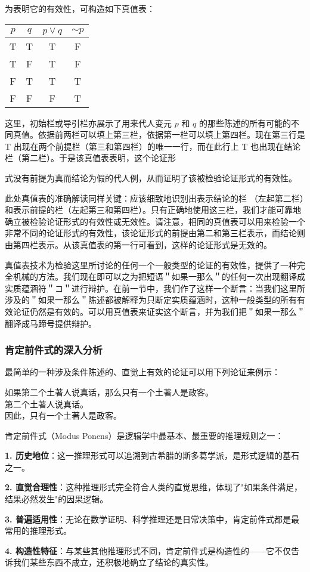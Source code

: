 为表明它的有效性，可构造如下真值表：

\begin{center}
\begin{tabular}{|cccc|}
\hline
$p$ & $q$ & $p \vee q$ & $\sim p$ \\
\hline
T & T & T & F \\
T & F & T & F \\
F & T & T & T \\
F & F & F & T \\
\hline
\end{tabular}
\end{center}

这里，初始栏或导引栏亦展示了用来代人变元 $p$ 和 $q$ 的那些陈述的所有可能的不同真值。依据前两栏可以填上第三栏，依据第一栏可以填上第四栏。现在第三行是 T 出现在两个前提栏（第三和第四栏）的唯一一行，而在此行上 T 也出现在结论栏（第二栏）。于是该真值表表明，这个论证形

式没有前提为真而结论为假的代人例，从而证明了该被检验论证形式的有效性。\cite{jevons1879}

此处真值表的准确解读同样关键：应该细致地识别出表示结论的栏 （左起第二栏）和表示前提的栏（左起第三和第四栏）。只有正确地使用这三栏，我们才能可靠地确立被检验论证形式的有效性或无效性。请注意，相同的真值表可以用来检验一个非常不同的论证形式的有效性，该论证形式的前提由第二和第三栏表示，而结论则由第四栏表示。从该真值表的第一行可看到，这样的论证形式是无效的。

真值表技术为检验这里所讨论的任何一个一般类型的论证的有效性，提供了一种完全机械的方法。我们现在即可以之为把短语＂如果一那么＂的任何一次出现翻译成实质蕴涵符＂コ＂进行辩护。在前一节中，我们作了这样一个断言：当我们这里所涉及的＂如果一那么＂陈述都被解释为只断定实质蕴涵时，这种一般类型的所有有效论证仍然是有效的。可以用真值表来证实这个断言，并为我们把＂如果一那么＂翻译成马蹄号提供辩护。

\subsubsection{肯定前件式的深入分析}

最简单的一种涉及条件陈述的、直觉上有效的论证可以用下列论证来例示：

如果第二个土著人说真话，那么只有一个土著人是政客。\\
第二个土著人说真话。\\
因此，只有一个土著人是政客。

\begin{theorembox}[title=肯定前件式的逻辑基础]
肯定前件式（Modus Ponens）是逻辑学中最基本、最重要的推理规则之一：

\textbf{1. 历史地位}：这一推理形式可以追溯到古希腊的斯多葛学派，是形式逻辑的基石之一。

\textbf{2. 直觉合理性}：这种推理形式完全符合人类的直觉思维，体现了"如果条件满足，结果必然发生"的因果逻辑。

\textbf{3. 普遍适用性}：无论在数学证明、科学推理还是日常决策中，肯定前件式都是最常用的推理形式。

\textbf{4. 构造性特征}：与某些其他推理形式不同，肯定前件式是构造性的——它不仅告诉我们某些东西不成立，还积极地确立了结论的真实性。
\end{theorembox}

